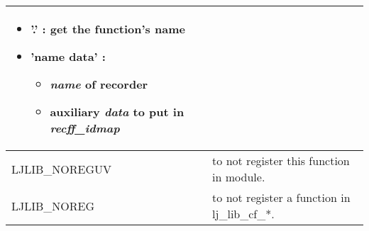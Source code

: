 \begin{table}
\begin{tabularx}{\textwidth}{|l|X|}
\begin{itemize}
  \item '.' : get the function's name
  \item 'name data' :
    \begin{itemize}
      \item \emph{name} of recorder
      \item auxiliary \emph{data} to put in \emph{recff\_idmap}
    \end{itemize}
  \end{itemize}                                                                             \\\hline
LJLIB\_NOREGUV                       & to not register this function in module.             \\\hline
LJLIB\_NOREG                         & to not register a function in lj\_lib\_cf\_*.        \\\hline
\end{tabularx}
\end{table}

